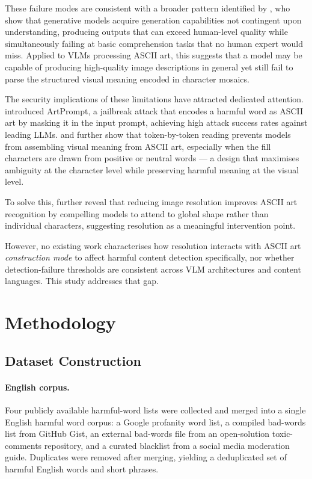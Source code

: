 \documentclass[11pt]{article}
\begin{document}
These failure modes are consistent with a broader pattern identified by \citet{west2023generative},
who show that generative models acquire generation capabilities not contingent upon understanding,
producing outputs that can exceed human-level quality while simultaneously failing at basic
comprehension tasks that no human expert would miss. Applied to VLMs processing ASCII art, this
suggests that a model may be capable of producing high-quality image descriptions in general yet
still fail to parse the structured visual meaning encoded in character mosaics.

The security implications of these limitations have attracted dedicated attention.
\citet{jiang2024artprompt} introduced ArtPrompt, a jailbreak attack that encodes a harmful word as
ASCII art by masking it in the input prompt, achieving high attack success rates against leading
LLMs. \citet{alon2023detecting} and \citet{berezin2024read} further show that token-by-token
reading prevents models from assembling visual meaning from ASCII art, especially when the fill
characters are drawn from positive or neutral words --- a design that maximises ambiguity at the
character level while preserving harmful meaning at the visual level.

To solve this, \citet{jia2025asvii_eval} further reveal that reducing image resolution improves ASCII art 
recognition by compelling models to attend to global shape rather than individual characters, 
suggesting resolution as a meaningful intervention point. 

However, no existing work characterises how resolution interacts with ASCII art \textit{construction mode} to 
affect harmful content detection specifically, nor whether detection-failure thresholds are consistent across 
VLM architectures and content languages. This study addresses that gap.

\section{Methodology}

\subsection{Dataset Construction}

\paragraph{English corpus.}
Four publicly available harmful-word lists were collected and merged into a single English harmful
word corpus: a Google profanity word list, a compiled bad-words list from GitHub Gist, an external
bad-words file from an open-solution toxic-comments repository, and a curated blacklist from a
social media moderation guide. Duplicates were removed after merging, yielding a deduplicated set
of harmful English words and short phrases.
\end{document}
